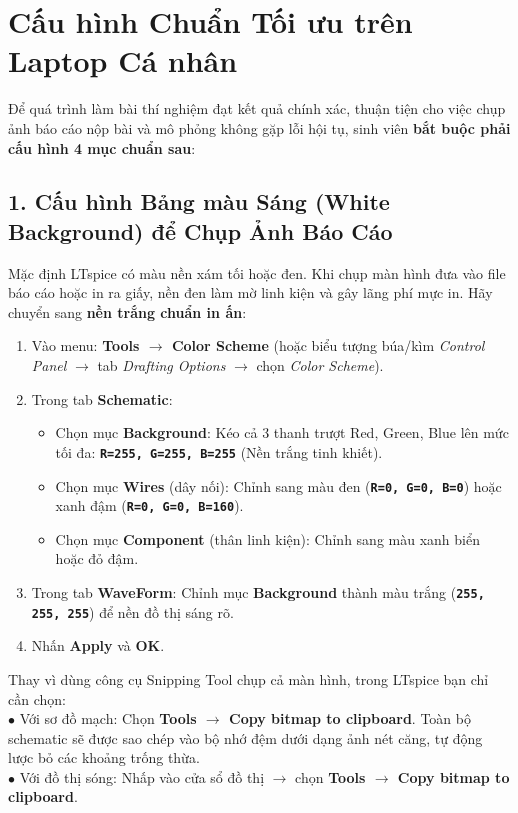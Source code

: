 \documentclass[11pt,a4paper]{article}
\newcommand{\code}[1]{\texttt{\color{navy}\textbf{#1}}}
\begin{document}
\section{Cấu hình Chuẩn Tối ưu trên Laptop Cá nhân}

Để quá trình làm bài thí nghiệm đạt kết quả chính xác, thuận tiện cho việc chụp ảnh báo cáo nộp bài và mô phỏng không gặp lỗi hội tụ, sinh viên \textbf{bắt buộc phải cấu hình 4 mục chuẩn sau}:

\subsection{1. Cấu hình Bảng màu Sáng (White Background) để Chụp Ảnh Báo Cáo}
Mặc định LTspice có màu nền xám tối hoặc đen. Khi chụp màn hình đưa vào file báo cáo hoặc in ra giấy, nền đen làm mờ linh kiện và gây lãng phí mực in. Hãy chuyển sang \textbf{nền trắng chuẩn in ấn}:
\begin{enumerate}[itemsep=2pt]
  \item Vào menu: \textbf{Tools $\rightarrow$ Color Scheme} (hoặc biểu tượng búa/kìm \textit{Control Panel} $\rightarrow$ tab \textit{Drafting Options} $\rightarrow$ chọn \textit{Color Scheme}).
  \item Trong tab \textbf{Schematic}:
  \begin{itemize}[itemsep=1pt]
    \item Chọn mục \textbf{Background}: Kéo cả 3 thanh trượt Red, Green, Blue lên mức tối đa: \code{R=255, G=255, B=255} (Nền trắng tinh khiết).
    \item Chọn mục \textbf{Wires} (dây nối): Chỉnh sang màu đen (\code{R=0, G=0, B=0}) hoặc xanh đậm (\code{R=0, G=0, B=160}).
    \item Chọn mục \textbf{Component} (thân linh kiện): Chỉnh sang màu xanh biển hoặc đỏ đậm.
  \end{itemize}
  \item Trong tab \textbf{WaveForm}: Chỉnh mục \textbf{Background} thành màu trắng (\code{255, 255, 255}) để nền đồ thị sáng rõ.
  \item Nhấn \textbf{Apply} và \textbf{OK}.
\end{enumerate}

\begin{tipbox}
Thay vì dùng công cụ Snipping Tool chụp cả màn hình, trong LTspice bạn chỉ cần chọn:\\
$\bullet$ Với sơ đồ mạch: Chọn \textbf{Tools $\rightarrow$ Copy bitmap to clipboard}. Toàn bộ schematic sẽ được sao chép vào bộ nhớ đệm dưới dạng ảnh nét căng, tự động lược bỏ các khoảng trống thừa.\\
$\bullet$ Với đồ thị sóng: Nhấp vào cửa sổ đồ thị $\rightarrow$ chọn \textbf{Tools $\rightarrow$ Copy bitmap to clipboard}.
\end{tipbox}
\end{document}
